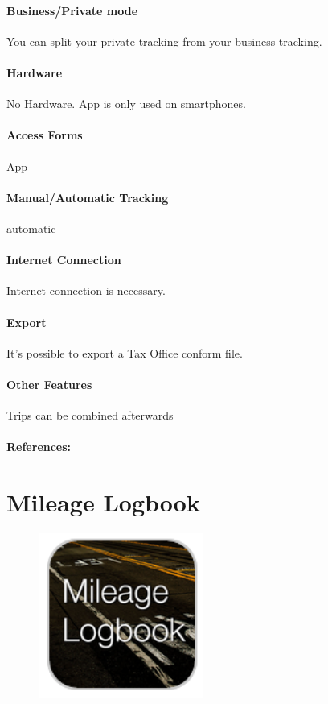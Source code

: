 \paragraph{Business/Private mode} You can split your private tracking from your business tracking.
\paragraph{Hardware} No Hardware. App is only used on smartphones.
\paragraph{Access Forms} App
\paragraph{Manual/Automatic Tracking} automatic
\paragraph{Internet Connection} Internet connection is necessary.
\paragraph{Export} It’s possible to export a Tax Office conform file.
\paragraph{Other Features}Trips can be combined afterwards
\paragraph{References:} \cite{TOUR}
\newpage

\section{Mileage Logbook}
\begin{figure}
  \begin{center}
    \includegraphics[width=0.48\textwidth]{bilder/mileage}
  \end{center}
\end{figure}
